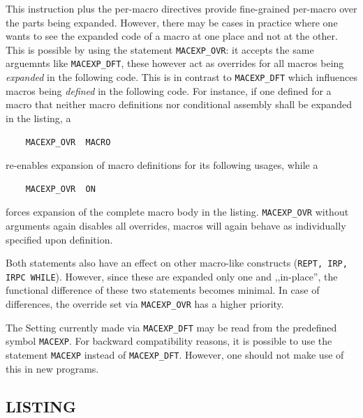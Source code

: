 \documentclass[12pt,twoside]{report}
\makeatletter
\newcommand{\tty}[1]{{\tt #1}}
\newcommand{\ttindex}[1]{\index{#1@{\tt #1}}}
\makeatother
\begin{document}
\par
This instruction plus the per-macro directives provide fine-grained
per-macro over the parts being expanded.  However, there may be cases
in practice where one wants to see the expanded code of a macro at
one place and not at the other.  This is possible by using the
statement \tty{MACEXP\_OVR}: it accepts the same arguemnts like
\tty{MACEXP\_DFT}, these however act as overrides for all macros being
{\em expanded} in the following code.  This is in contrast to
\tty{MACEXP\_DFT} which influences macros being {\em defined} in the
following code.  For instance, if one defined for a macro that
neither macro definitions nor conditional assembly shall be expanded
in the listing, a
\begin{verbatim}
	MACEXP_OVR  MACRO
\end{verbatim}
re-enables expansion of macro definitions for its following usages,
while a
\begin{verbatim}
	MACEXP_OVR  ON
\end{verbatim}
forces expansion of the complete macro body in the listing.
\tty{MACEXP\_OVR} without arguments again disables all overrides,
macros will again behave as individually specified upon definition.
\par
Both statements also have an effect on other macro-like constructs
(\tty{REPT, IRP, IRPC WHILE}).  However, since these are expanded
only one and ,,in-place'', the functional difference of these two
statements becomes minimal.  In case of differences, the override set
via \tty{MACEXP\_OVR} has a higher priority.

The Setting currently made via \tty{MACEXP\_DFT} may be read from the
predefined symbol \tty{MACEXP}.  For backward compatibility reasons,
it is possible to use the statement \tty{MACEXP} instead of
\tty{MACEXP\_DFT}.  However, one should not make use of this in new
programs.


\subsection{LISTING}
\ttindex{LISTING}\label{SectListingCmd}
\end{document}
